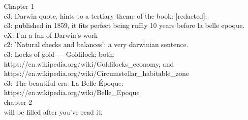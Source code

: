 Chapter 1\\[1cm]
c3: Darwin quote, hints to a tertiary theme of the book: [redacted].\\
c3: published in 1859, it fits perfect being ruffly 10 years before la belle epoque.\\
cX: I'm a fan of Darwin's work\\
c2: 'Natural checks and balances': a very darwinian sentence.\\
c3: Locks of gold --- Goldilock: both: https://en.wikipedia.org/wiki/Goldilocks\_economy, and https://en.wikipedia.org/wiki/Circumstellar\_habitable\_zone\\
c3: The beautiful era: La Belle Époque: https://en.wikipedia.org/wiki/Belle\_Epoque\\
chapter 2 \\
will be filled after you've read it.